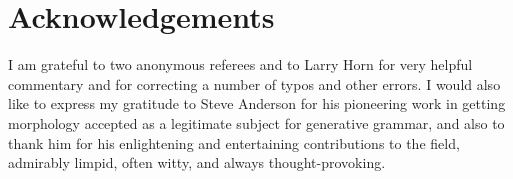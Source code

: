 \documentclass[output=paper,
modfonts
]{LSP/langsci}
\begin{document}
\section*{Acknowledgements}
I am grateful to two anonymous referees and to Larry Horn for very helpful commentary and for correcting a number of typos and other errors. I would also like to express my gratitude to Steve Anderson for his pioneering work in getting morphology accepted as a legitimate subject for generative grammar, and also to thank him for his enlightening and entertaining contributions to the field,  admirably limpid,  often witty, and always thought-provoking.

\printbibliography[heading=subbibliography,notkeyword=this]
\end{document}
